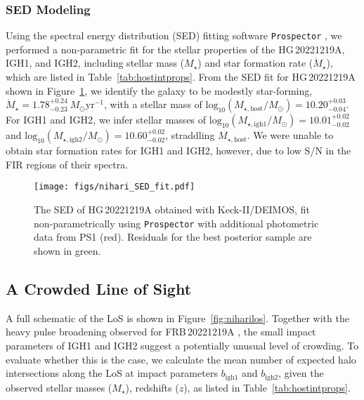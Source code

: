 \documentclass[twocolumn, linenumbers, tra]{aastex631}
\newcommand{\nihari}{FRB\,20221219A } %
\begin{document}
\subsubsection{SED Modeling}\label{sec:sed}

Using the spectral energy distribution (SED) fitting software \texttt{Prospector} \citep{Johnson2021}, we performed a non-parametric fit for the stellar properties of the HG\,20221219A, IGH1, and IGH2, including stellar mass ($M_{\star}$) and star formation rate ($\dot{M}_{\star}$), which are listed in Table~\ref{tab:hostintprops}. From the SED fit for HG\,20221219A shown in Figure\ \ref{fig:niharised}, we identify the galaxy to be modestly star-forming, $\dot{M}_{\star} = 1.78_{-0.23}^{+0.24} \ M_\odot \mathrm{yr}^{-1}$, with a stellar mass of $\mathrm{log}_{10}(M_{\star, \mathrm{host}}/M_\odot) = 10.20^{+0.03}_{-0.04}$. For IGH1 and IGH2, we infer stellar masses of $\mathrm{log}_{10}(M_{\star, \mathrm{igh1}}/M_\odot) = 10.01^{+0.02}_{-0.02}$ and $\mathrm{log}_{10}(M_{\star, \mathrm{igh2}}/M_\odot) = 10.60^{+0.02}_{-0.02}$, straddling $M_{\star, \mathrm{host}}$. We were unable to obtain star formation rates for IGH1 and IGH2, however, due to low S/N in the FIR regions of their spectra.

\begin{figure}
  \centering
  \hspace{-0.3 cm}
  \texttt{[image: figs/nihari\_SED\_fit.pdf]}
  \caption{The SED of HG\,20221219A obtained with Keck-II/DEIMOS, fit non-parametrically using \texttt{Prospector} with additional photometric data from PS1 (red). Residuals for the best posterior sample are shown in green.}
  \label{fig:niharised}
\end{figure}

\subsection{A Crowded Line of Sight}\label{sec:crowding}

A full schematic of the LoS is shown in Figure\ \ref{fig:niharilos}. Together with the heavy pulse broadening observed for \nihari, the small impact parameters of IGH1 and IGH2 suggest a potentially unusual level of crowding. To evaluate whether this is the case, we calculate the mean number of expected halo intersections along the LoS at impact parameters $b_{\mathrm{igh1}}$ and $b_{\mathrm{igh2}}$, given the observed stellar masses ($M_{\star}$), redshifts ($z$), as listed in Table~\ref{tab:hostintprops}. 
\end{document}
